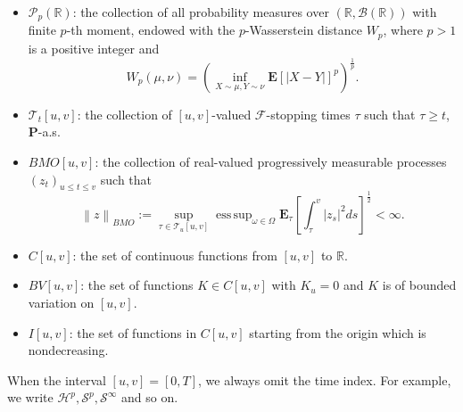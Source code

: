 \documentclass[10pt]{article}%
\numberwithin{equation}{section}
\begin{document}
\begin{itemize}
	\item $\mathcal{P}_{p}\left(\mathbb{R}\right)$: the collection of all probability measures over $\left(\mathbb{R},\mathcal{B}\left(\mathbb{R}\right)\right)$ with finite $p$-th moment, endowed with the $p$-Wasserstein distance $W_{p}$, where $p > 1$ is a positive integer and $$W_{p}(\mu,\nu)=\left(\inf_{X \sim \mu,Y \sim\nu}\mathbf{E}[\left|X-Y\right|]^p\right)^{\frac{1}{p}}.$$
	
	
	
	
	\item $\mathcal{T}_{t}[u,v]$: the collection of $\left[u,v\right]$-valued $\mathcal{F}$-stopping times $\tau$ such that $\tau \geq t$, $\mathbf{P}$-a.s. 
	
	\item $BMO\left[u,v\right]$: the collection of real-valued progressively measurable processes $\left(z_{t}\right)_{u\leq t \leq v}$ such that 
	$$\left \| z \right \|_{BMO}:=\sup_{\tau\in \mathcal{T}_{u}\left[u,v\right]}\operatorname{ess\,sup}_{\omega\in\Omega}\mathbf{E}_{\tau}\left[\int_{\tau}^{v}\left | z_{s} \right |^2 d s \right]^{\frac{1}{2}}<\infty. $$
   
	
	\item $C\left[u,v\right]$: the set of continuous functions from $\left[u,v\right]$ to $\mathbb{R}$.

	\item  $BV\left[u,v\right]$: the set of functions $K\in C\left[u,v\right]$ with $K_u=0$ and $K$ is of bounded variation on $\left[u,v\right]$.
	
	\item  $I\left[u,v\right]$: the set of functions in $C\left[u,v\right]$ starting from the origin which is nondecreasing.
 \end{itemize}
	
When the interval $[u,v]=[0,T]$, we always omit the time index. %
 For example, we write $\mathcal{H}^{p},\mathcal{S}^p,\mathcal{S}^{\infty}$ and so on. 
\end{document}
